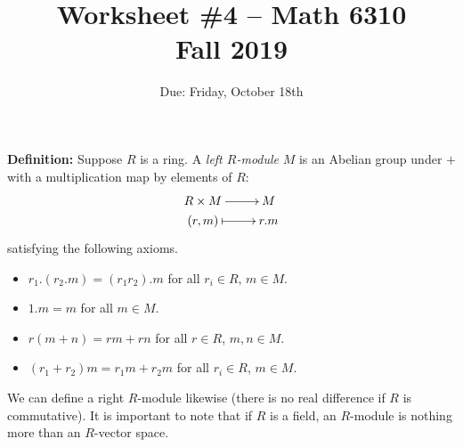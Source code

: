 \documentclass[11pt]{amsart}
\theoremstyle{theorem}
\begin{document}
\title{Worksheet \#4 -- Math 6310\\Fall 2019}
\author{Due: Friday, October 18th}
\maketitle

\noindent
{\bf Definition: }  Suppose $R$ is a ring.  A \emph{left $R$-module} $M$ is an Abelian group under $+$ with a multiplication map by elements of $R$:
\[
    \xymatrix@R=1pt{
        R \times M \ar[r] & M\\
        (r, m) \ar@{|->}[r] & r.m
    }
\]
satisfying the following axioms.
\begin{itemize}
\item[(1)] $r_1.(r_2.m) = (r_1 r_2).m$ for all $r_i \in R$, $m \in M$.
\item[(2)] $1.m = m$ for all $m \in M$.
\item[(3)] $r(m+n) = rm + rn$ for all $r \in R$, $m,n \in M$.
\item[(4)] $(r_1 + r_2)m = r_1 m + r_2 m$ for all $r_i \in R$, $m \in M$.
\end{itemize}
We can define a right $R$-module likewise (there is no real difference if $R$ is commutative).
\vskip 9pt
It is important to note that if $R$ is a field, an $R$-module is nothing more than an $R$-vector space.
\end{document}
